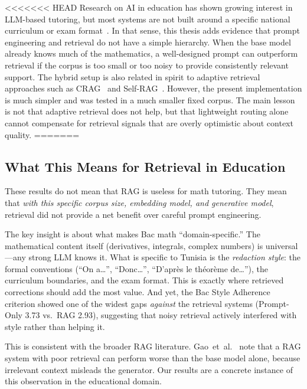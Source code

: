 <<<<<<< HEAD
Research on AI in education has shown growing interest in LLM-based
tutoring, but most systems are not built around a specific national
curriculum or exam format~\cite{kasneci2023chatgpt_education}. In that
sense, this thesis adds evidence that prompt engineering and retrieval do
not have a simple hierarchy. When the base model already knows much of the
mathematics, a well-designed prompt can outperform retrieval if the corpus
is too small or too noisy to provide consistently relevant support.
The hybrid setup is also related in spirit to adaptive retrieval approaches
such as CRAG~\cite{yan2024practical_rag} and Self-RAG~\cite{asai2023self_rag}.
However, the present implementation is much simpler and was tested in a much
smaller fixed corpus. The main lesson is not that adaptive retrieval does
not help, but that lightweight routing alone cannot compensate for retrieval
signals that are overly optimistic about context quality.
=======
\subsection{What This Means for Retrieval in Education}
\label{subsec:value-of-retrieval}

These results do not mean that RAG is useless for math tutoring. They mean
that \textit{with this specific corpus size, embedding model, and generative
model}, retrieval did not provide a net benefit over careful prompt
engineering.

The key insight is about what makes Bac math ``domain-specific.'' The
mathematical content itself (derivatives, integrals, complex numbers) is
universal—any strong LLM knows it. What is specific to Tunisia is the
\textit{redaction style}: the formal conventions (``On a\ldots'',
``Donc\ldots'', ``D'après le théorème de\ldots''), the curriculum boundaries,
and the exam format. This is exactly where retrieved corrections should add
the most value. And yet, the Bac Style Adherence criterion showed one of
the widest gaps \textit{against} the retrieval systems (Prompt-Only 3.73
vs.\ RAG 2.93), suggesting that noisy retrieval actively interfered with
style rather than helping it.

This is consistent with the broader RAG literature.
Gao~et~al.~\cite{gao2024rag_survey} note that a RAG system with poor
retrieval can perform worse than the base model alone, because irrelevant
context misleads the generator. Our results are a concrete instance of this
observation in the educational domain.

